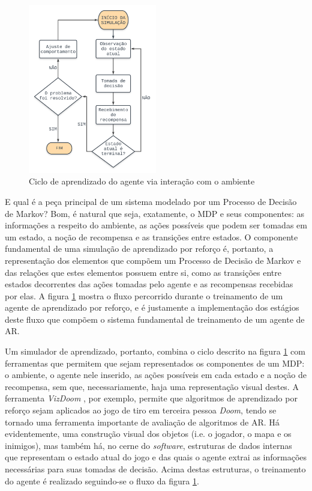 \documentclass[cic,tc]{iiufrgs}
\begin{document}
\begin{figure}[ht]
    \begin{center}
      \includegraphics[width=0.5\textwidth]{fluxo_ar.png}
    \end{center}
    \caption{Ciclo de aprendizado do agente via interação com o ambiente}
    \label{fig:fluxo_ar}
\end{figure}


E qual é a peça principal de um sistema modelado por um Processo de Decisão de
Markov? Bom, é natural que seja, exatamente, o MDP e seus componentes: as
informações a respeito do ambiente, as ações possíveis que podem ser tomadas em
um estado, a noção de recompensa e as transições entre estados. O componente
fundamental de uma simulação de aprendizado por reforço é, portanto, a
representação dos elementos que compõem um Processo de Decisão de Markov e das
relações que estes elementos possuem entre si, como as transições entre estados
decorrentes das ações tomadas pelo agente e as recompensas recebidas por elas.
A figura \ref{fig:fluxo_ar} mostra o fluxo percorrido durante o treinamento de
um agente de aprendizado por reforço, e é justamente a implementação dos
estágios deste fluxo que compõem o sistema fundamental de treinamento de um
agente de AR.


Um simulador de aprendizado, portanto, combina o ciclo descrito na figura
\ref{fig:fluxo_ar} com ferramentas que permitem que sejam representados os
componentes de um MDP: o ambiente, o agente nele inserido, as ações possíveis
em cada estado e a noção de recompensa, sem que, necessariamente, haja uma
representação visual destes. A ferramenta \textit{VizDoom} \cite{VizDoom}, por exemplo,
permite que algoritmos de aprendizado por reforço sejam aplicados ao jogo de
tiro em terceira pessoa \textit{Doom}, tendo se tornado uma ferramenta
importante de avaliação de algoritmos de AR. Há evidentemente, uma construção
visual dos objetos (i.e. o jogador, o mapa e os inimigos), mas também há, no
cerne do \textit{software}, estruturas de dados internas que representam o
estado atual do jogo e das quais o agente extrai as informações necessárias para
suas tomadas de decisão. Acima destas estruturas, o treinamento do agente é
realizado seguindo-se o fluxo da figura \ref{fig:fluxo_ar}.
\end{document}
